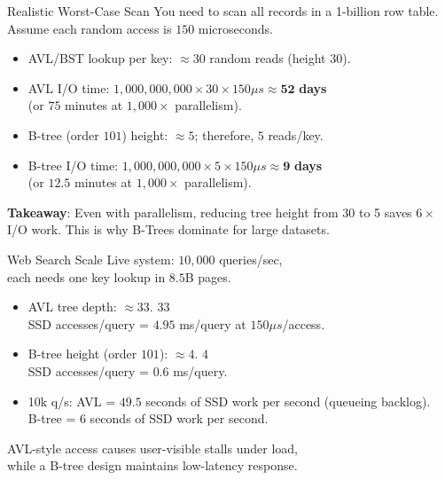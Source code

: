 \documentclass[14pt,aspectratio=1610]{beamer}
\begin{document}
\begin{frame}{Realistic Worst-Case Scan}
You need to scan all records in a 1-billion row table.\\
Assume each random access is \(150\) microseconds.

\pause{}
\begin{itemize}[<+->]
  \item AVL/BST lookup per key: \(\approx 30\) random reads (height \(30\)).
  \item AVL I/O time: \(1{,}000{,}000{,}000 \times 30 \times 150\mu{}s \approx \mathbf{52}\) \textbf{days}\\ (or \(75\) minutes at \(1{,}000\times{}\) parallelism).
  \item B-tree (order \(101\)) height: \(\approx 5\); therefore, \(5\) reads/key.
  \item B-tree I/O time: \(1{,}000{,}000{,}000 \times 5 \times 150\mu{}s \approx \mathbf{9}\) \textbf{days}\\ (or \(12.5\) minutes at \(1{,}000\times{}\) parallelism).
\end{itemize}

\pause{}
\textbf{Takeaway}: Even with parallelism, reducing tree height from 30 to 5 saves \(6\times{}\) I/O work. This is why B-Trees dominate for large datasets.
\end{frame}

\begin{frame}{Web Search Scale}
Live system: \(10,000\) queries/sec,\\
each needs one key lookup in \(8.5\)B pages.

\pause{}
\begin{itemize}[<+->]
  \item AVL tree depth: \(\approx 33\). \(33\) \\
    SSD accesses/query = \(4.95\) ms/query at \(150\mu{}s\)/access.
  \item B-tree height (order \(101\)): \(\approx 4\). \(4\) \\
    SSD accesses/query = \(0.6\) ms/query.
  \item 10k q/s: AVL = \(49.5\) seconds of SSD work per second (queueing backlog).\\
    B-tree = \(6\) seconds of SSD work per second.
\end{itemize}

\pause{}
AVL-style access causes user-visible stalls under load,\\
while a B-tree design maintains low-latency response.
\end{frame}
\end{document}
